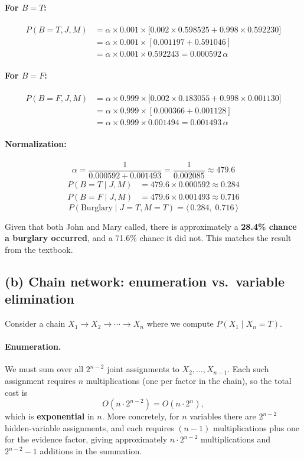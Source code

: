 \documentclass[12pt]{article}
\begin{document}
\paragraph{For $B=T$:}
\begin{align*}
P(B{=}T,J,M)
  &=\alpha\times0.001\times\bigl[0.002\times0.598525+0.998\times0.592230\bigr]\\
  &=\alpha\times0.001\times[0.001197+0.591046]\\
  &=\alpha\times0.001\times0.592243
   =0.000592\,\alpha
\end{align*}

\paragraph{For $B=F$:}
\begin{align*}
P(B{=}F,J,M)
  &=\alpha\times0.999\times\bigl[0.002\times0.183055+0.998\times0.001130\bigr]\\
  &=\alpha\times0.999\times[0.000366+0.001128]\\
  &=\alpha\times0.999\times0.001494
   =0.001493\,\alpha
\end{align*}

\paragraph{Normalization:}
\[
\alpha=\frac{1}{0.000592+0.001493}=\frac{1}{0.002085}\approx479.6
\]
\begin{align*}
P(B{=}T\mid J,M)&=479.6\times0.000592\approx0.284\\
P(B{=}F\mid J,M)&=479.6\times0.001493\approx0.716
\end{align*}
\[
\boxed{P(\text{Burglary}\mid J{=}T,M{=}T)=\langle\,0.284,\;0.716\,\rangle}
\]

Given that both John and Mary called, there is approximately a \textbf{28.4\% chance a burglary occurred},
and a 71.6\% chance it did not. This matches the result from the textbook.

\subsection*{(b) Chain network: enumeration vs.\ variable elimination}

Consider a chain $X_1\to X_2\to\cdots\to X_n$ where we compute $P(X_1\mid X_n=T)$.

\paragraph{Enumeration.}
We must sum over all $2^{n-2}$ joint assignments to $X_2,\ldots,X_{n-1}$.
Each such assignment requires $n$ multiplications (one per factor in the chain), so the
total cost is
\[
O\!\left(n\cdot 2^{n-2}\right)=O(n\cdot 2^n),
\]
which is \textbf{exponential} in $n$. More concretely, for $n$ variables there are $2^{n-2}$
hidden-variable assignments, and each requires $(n-1)$ multiplications plus one for the
evidence factor, giving approximately $n\cdot 2^{n-2}$ multiplications and $2^{n-2}-1$
additions in the summation.
\end{document}
